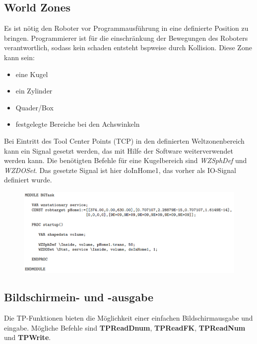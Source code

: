 \subsection{World Zones}
Es ist nötig den Roboter vor Programmausführung in eine definierte Position zu bringen.
Programmierer ist für die einschränkung der Bewegungen des Roboters verantwortlich, sodass kein schaden entsteht bspweise durch Kollision.
Diese Zone kann sein:
\begin{itemize}
	\item eine Kugel
	\item ein Zylinder
	\item Quader/Box
	\item festgelegte Bereiche bei den Achswinkeln
\end{itemize}
Bei Eintritt des Tool Center Points (TCP) in den definierten Weltzonenbereich kann ein Signal gesetzt werden, das mit Hilfe der Software weiterverwendet werden kann.
Die benötigten Befehle für eine Kugelbereich sind \textit{WZSphDef} und \textit{WZDOSet}.
Das gesetzte Signal ist hier doInHome1, das vorher als IO-Signal definiert wurde.
\begin{figure}[H]
	\begin{center}
		\includegraphics[scale=0.8]{resources/PNG/robocode1.PNG}
		\caption{}
		\label{fig:resources/PNG/robocode1.PNG}
	\end{center}
\end{figure}
\subsection{Bildschirmein- und -ausgabe}
Die TP-Funktionen bieten die Möglichkeit einer einfachen Bildschirmausgabe und eingabe.
Mögliche Befehle sind \textbf{TPReadDnum}, \textbf{TPReadFK}, \textbf{TPReadNum} und \textbf{TPWrite}.
